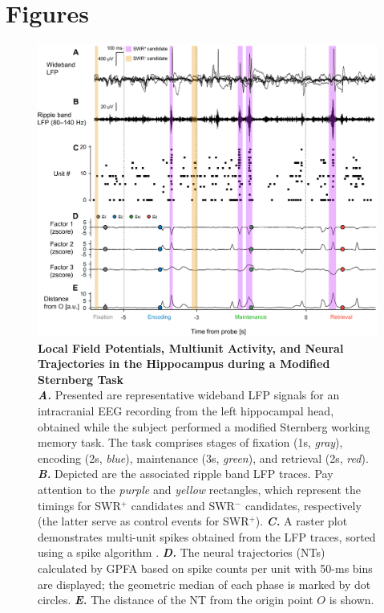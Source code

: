 \documentclass[final,3p,times,twocolumn]{elsarticle}
\begin{document}
\section*{Figures}
\label{figures}
        \clearpage
        \begin{figure}[ht]
        	\centering
            \includegraphics[width=1\textwidth]{./src/figures/.png/Figure_ID_01.png}
        	\caption{\textbf{
Local Field Potentials, Multiunit Activity, and Neural Trajectories in the Hippocampus during a Modified Sternberg Task
}
\smallskip
\\
\textbf{\textit{A.}} Presented are representative wideband LFP signals for an intracranial EEG recording from the left hippocampal head, obtained while the subject performed a modified Sternberg working memory task. The task comprises stages of fixation (1s, \textit{gray}), encoding (2s, \textit{blue}), maintenance (3s, \textit{green}), and retrieval (2s, \textit{red}). \textbf{\textit{B.}} Depicted are the associated ripple band LFP traces. Pay attention to the \textit{purple} and \textit{yellow} rectangles, which represent the timings for SWR$^+$ candidates and SWR$^-$ candidates, respectively (the latter serve as control events for SWR$^+$). \textbf{\textit{C.}} A raster plot demonstrates multi-unit spikes obtained from the LFP traces, sorted using a spike algorithm \cite{niediek_reliable_2016}. \textbf{\textit{D.}} The neural trajectories (NTs) calculated by GPFA\cite{yu_gaussian-process_2009} based on spike counts per unit with 50-ms bins are displayed; the geometric median of each phase is marked by dot circles. \textbf{\textit{E.}} The distance of the NT from the origin point $O$ is shown.
}
        	\label{fig:01}
        \end{figure}
\end{document}
